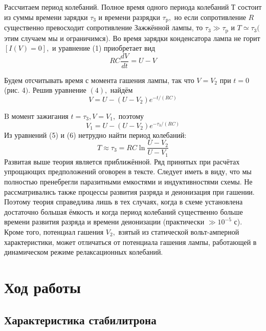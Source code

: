 \documentclass[a4paper,12pt]{article} %
\begin{document}
Рассчитаем период колебаний. Полное время одного периода колебаний Т состоит из суммы времени зарядки $\tau_{3}$ и времени разрядки $\tau_{\mathrm{p}},$ но если сопротивление $R$ существенно превосходит сопротивление Зажжённой лампы, то $\tau_{3} \gg \tau_{\mathrm{p}}$ и $T \simeq \tau_{3}($ этим случаем мы и ограничимся). Во время зарядки конденсатора лампа не горит $[I(V)=0],$ и уравнение (1) приобретает вид
\begin{equation}
R C \frac{d V}{d t}=U-V    
\end{equation}

Будем отсчитывать время с момента гашения лампы, так что $V=V_{2}$ при $t=0$ (рис. 4$) .$ Решив уравнение $(4),$ найдём
\begin{equation}
 V=U-\left(U-V_{2}\right) e^{-t /(R C)}   
\end{equation}


$\mathrm{B}$ момент зажигания $t=\tau_{3}, V=V_{1},$ поэтому
\begin{equation}
V_{1}=U-\left(U-V_{2}\right) e^{-\tau_{3} /(R C)}
\end{equation}
Из уравнений (5) и (6) нетрудно найти период колебаний:
$$
T \approx \tau_{3}=R C \ln \frac{U-V_{2}}{U-V_{1}}
$$
Развитая выше теория является приближённой. Ряд принятых при расчётах упрощающих предположений оговорен в тексте. Следует иметь в виду, что мы полностью пренебрегли паразитными емкостями и индуктивностями схемы. Не
рассматривались также процессы развития разряда и деионизация при гашении. Поэтому теория справедлива лишь в тех случаях, когда в схеме установлена достаточно большая ёмкость и когда период колебаний существенно больше времени развития разряда и времени деионизации (практически $\gg 10^{-5}$ с). Кроме того, потенциал гашения $V_{2},$ взятый из статической вольт-амперной характеристики, может отличаться от потенциала гашения лампы, работающей в динамическом режиме релаксационных колебаний.

\section{Ход работы}


\subsection{Характеристика стабилитрона}
\end{document}
